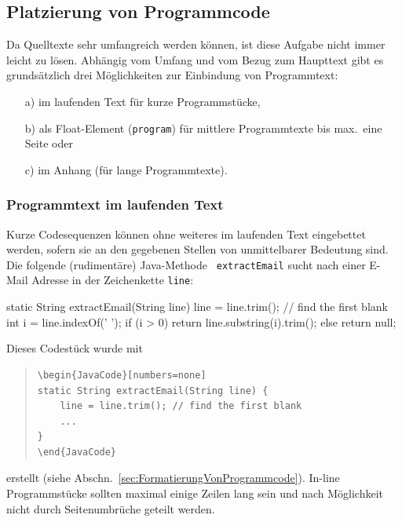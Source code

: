\subsection{Platzierung von Programmcode}

Da Quelltexte sehr umfangreich werden können, ist diese Aufgabe nicht
immer leicht zu lösen. Abhängig vom Umfang und vom Bezug zum Haupttext
gibt es grundsätzlich drei Möglichkeiten zur Einbindung von Programmtext:
%
\begin{itemize}
\item[a)] im laufenden Text für kurze Programmstücke,
\item[b)] als Float-Element (\texttt{program}) für mittlere Programmtexte bis max.\ eine Seite oder
\item[c)] im Anhang (für lange Programmtexte).
\end{itemize}

\subsubsection{Programmtext im laufenden Text}

Kurze Codesequenzen können ohne weiteres im laufenden Text
eingebettet werden, sofern sie an den gegebenen Stellen von unmittelbarer
Bedeutung sind. Die folgende (rudimentäre) Java-Methode {\tt
extractEmail} sucht nach einer E-Mail Adresse in der Zeichenkette
\texttt{line}:
%
\begin{JavaCode}[numbers=none]
static String extractEmail(String line) {
    line = line.trim(); // find the first blank
    int i = line.indexOf(' '); 
    if (i > 0)
        return line.substring(i).trim();
    else
        return null;
}
\end{JavaCode}
\medskip

\noindent
Dieses Codestück wurde mit 
%
\begin{quote}
\begin{verbatim}
\begin{JavaCode}[numbers=none]
static String extractEmail(String line) {
    line = line.trim(); // find the first blank
    ...
}
\end{JavaCode}
\end{verbatim}
\end{quote}
%
erstellt (siehe Abschn.\ \ref{sec:FormatierungVonProgrammcode}). 
In-line Programmstücke sollten maximal einige Zeilen lang sein und 
nach Möglichkeit nicht durch Seitenumbrüche geteilt werden.


